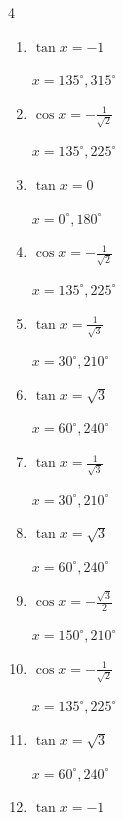 \begin{multicols}{4}
\begin{enumerate}
        $\displaystyle x = 45^{\circ} , 315^{\circ}$

  \item $\displaystyle \tan{x}  = -1$

        $\displaystyle x = 135^{\circ} , 315^{\circ}$

  \item $\displaystyle \cos{x}  = -\frac{1}{\sqrt{2}}$

        $\displaystyle x = 135^{\circ} , 225^{\circ}$

  \item $\displaystyle \tan{x}  = 0$

        $\displaystyle x = 0^{\circ} , 180^{\circ}$

  \item $\displaystyle \cos{x}  = -\frac{1}{\sqrt{2}}$

        $\displaystyle x = 135^{\circ} , 225^{\circ}$

  \item $\displaystyle \tan{x}  = \frac{1}{\sqrt{3}}$

        $\displaystyle x = 30^{\circ} , 210^{\circ}$

  \item $\displaystyle \tan{x}  = \sqrt{3}$

        $\displaystyle x = 60^{\circ} , 240^{\circ}$

  \item $\displaystyle \tan{x}  = \frac{1}{\sqrt{3}}$

        $\displaystyle x = 30^{\circ} , 210^{\circ}$

  \item $\displaystyle \tan{x}  = \sqrt{3}$

        $\displaystyle x = 60^{\circ} , 240^{\circ}$

  \item $\displaystyle \cos{x}  = -\frac{\sqrt{3}}{2}$

        $\displaystyle x = 150^{\circ} , 210^{\circ}$

  \item $\displaystyle \cos{x}  = -\frac{1}{\sqrt{2}}$

        $\displaystyle x = 135^{\circ} , 225^{\circ}$

  \item $\displaystyle \tan{x}  = \sqrt{3}$

        $\displaystyle x = 60^{\circ} , 240^{\circ}$

  \item $\displaystyle \tan{x}  = -1$


\end{enumerate}
\end{multicols}
